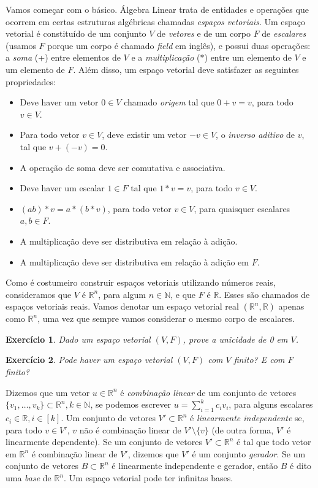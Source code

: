 \documentclass[]{article}
\newtheorem{exercicio}{Exercício}
\numberwithin{equation}{section}
\begin{document}
Vamos começar com o básico. Álgebra Linear trata de entidades e operações que ocorrem em certas estruturas algébricas chamadas \emph{espaços vetoriais}. Um espaço vetorial é constituído de um conjunto $V$ de \emph{vetores} e de um corpo $F$ de \emph{escalares} (usamos $F$ porque um corpo é chamado \emph{field} em inglês), e possui duas operações: a \emph{soma} (+) entre elementos de $V$ e a \emph{multiplicação} ($*$) entre um elemento de $V$ e um elemento de $F$. Além disso, um espaço vetorial deve satisfazer as seguintes propriedades:
\begin{itemize}
	\item
		Deve haver um vetor $0 \in V$ chamado \emph{origem} tal que $0 + v = v$, para todo $v \in V$.
	\item
		Para todo vetor $v \in V$, deve existir um vetor $-v \in V$, o \emph{inverso aditivo} de $v$, tal que $v + (-v) = 0$.
	\item
		A operação de soma deve ser comutativa e associativa.
	\item
		Deve haver um escalar $1 \in F$ tal que $1 * v = v$, para todo $v \in V$.
	\item
		$(ab)*v = a*(b*v)$, para todo vetor $v \in V$, para quaisquer escalares $a, b \in F$.
	\item
		A multiplicação deve ser distributiva em relação à adição.
	\item
		A multiplicação deve ser distributiva em relação à adição em $F$.
\end{itemize}

Como é costumeiro construir espaços vetoriais utilizando números reais, consideramos que $V$ é $\mathbb{R}^n$, para algum $n \in \mathbb{N}$, e que $F$ é $\mathbb{R}$. Esses são chamados de espaços vetoriais reais. Vamos denotar um espaço vetorial real $(\mathbb{R}^n, \mathbb{R})$ apenas como $\mathbb{R}^n$, uma vez que sempre vamos considerar o mesmo corpo de escalares.

\begin{exercicio}
	Dado um espaço vetorial $(V, F)$, prove a unicidade de 0 em $V$.
\end{exercicio}

\begin{exercicio}
	Pode haver um espaço vetorial $(V, F)$ com $V$ finito? E com $F$ finito?
\end{exercicio}

Dizemos que um vetor $u \in \mathbb{R}^n$ é \emph{combinação linear} de um conjunto de vetores $\{v_1, \dots, v_k\} \subset \mathbb{R}^n, k \in \mathbb{N}$, se podemos escrever $u = \sum_{i = 1}^{k} c_i v_i$, para alguns escalares $c_i \in \mathbb{R}, i \in [k]$. Um conjunto de vetores $V' \subset \mathbb{R}^n$ é \emph{linearmente independente} se, para todo $v \in V'$, $v$ não é combinação linear de $V' \setminus \{v\}$ (de outra forma, $V'$ é linearmente dependente). Se um conjunto de vetores $V' \subset \mathbb{R}^n$ é tal que todo vetor em $\mathbb{R}^n$ é combinação linear de $V'$, dizemos que $V'$ é um conjunto \emph{gerador}. Se um conjunto de vetores $B \subset \mathbb{R}^n$ é linearmente independente e gerador, então $B$ é dito uma \emph{base} de $\mathbb{R}^n$. Um espaço vetorial pode ter infinitas bases.
\end{document}
